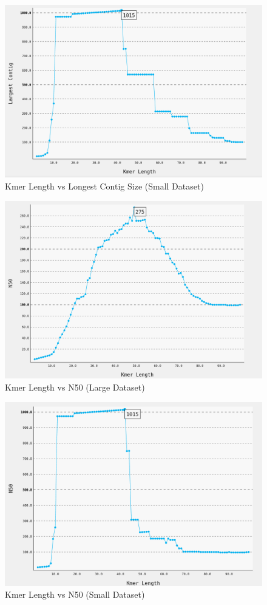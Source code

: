 \documentclass[12pt]{article}
\begin{document}
\begin{figure}[p]
\centering
\includegraphics[width=5.25in]{klen_vs_largestcontig_small_fasta.png}
\caption{Kmer Length vs Longest Contig Size (Small Dataset)}
\label{fig:kmer_to_contig_small}
\end{figure}

\begin{figure}[p]
\centering
\includegraphics[width=5.25in]{klen_vs_n50_large_fasta.png}
\caption{Kmer Length vs N50 (Large Dataset)}
\label{fig:kmer_to_n50_large}
\end{figure}

\begin{figure}[p]
\centering
\includegraphics[width=5.25in]{klen_vs_n50_small_fasta.png}
\caption{Kmer Length vs N50 (Small Dataset)}
\label{fig:kmer_to_n50_small}
\end{figure}
\end{document}
